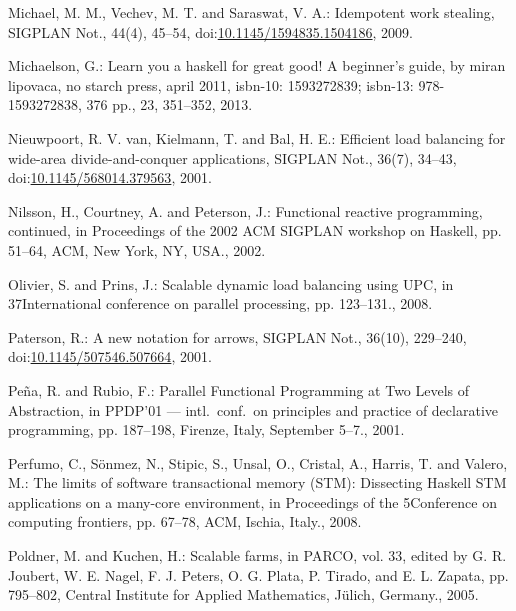 \documentclass[paper=A4,twoside=true,openright,parskip=full,chapterprefix=true,headings=normal,bibliography=totoc,listof=totoc,titlepage=on,captions=tableabove,draft=false,british]{scrreprt}%
\begin{document}
\leavevmode\hypertarget{ref-Michael:2009:IWS:1594835.1504186}{}%
Michael, M. M., Vechev, M. T. and Saraswat, V. A.: Idempotent work
stealing, SIGPLAN Not., 44(4), 45--54,
doi:\href{https://doi.org/10.1145/1594835.1504186}{10.1145/1594835.1504186},
2009.

\leavevmode\hypertarget{ref-learnyouahaskell}{}%
Michaelson, G.: Learn you a haskell for great good! A beginner's guide,
by miran lipovaca, no starch press, april 2011, isbn-10: 1593272839;
isbn-13: 978-1593272838, 376 pp., 23, 351--352, 2013.

\leavevmode\hypertarget{ref-vanNieuwpoort:2001:ELB:568014.379563}{}%
Nieuwpoort, R. V. van, Kielmann, T. and Bal, H. E.: Efficient load
balancing for wide-area divide-and-conquer applications, SIGPLAN Not.,
36(7), 34--43,\\
doi:\href{https://doi.org/10.1145/568014.379563}{10.1145/568014.379563},
2001.

\leavevmode\hypertarget{ref-Nilsson:2002:FRP:581690.581695}{}%
Nilsson, H., Courtney, A. and Peterson, J.: Functional reactive
programming, continued, in Proceedings of the 2002 ACM SIGPLAN workshop
on Haskell, pp. 51--64, ACM, New York, NY, USA., 2002.

\leavevmode\hypertarget{ref-4625841}{}%
Olivier, S. and Prins, J.: Scalable dynamic load balancing using UPC, in
37International conference on parallel processing, pp. 123--131., 2008.

\leavevmode\hypertarget{ref-Paterson:2001:NNA:507669.507664}{}%
Paterson, R.: A new notation for arrows, SIGPLAN Not., 36(10), 229--240,\\
doi:\href{https://doi.org/10.1145/507546.507664}{10.1145/507546.507664},
2001.

\leavevmode\hypertarget{ref-Eden:PPDP01}{}%
Peña, R. and Rubio, F.: Parallel Functional Programming at Two Levels of
Abstraction, in PPDP'01 --- intl.~conf.~on principles and practice of
declarative programming, pp. 187--198, Firenze, Italy, September 5--7.,
2001.

\leavevmode\hypertarget{ref-Perfumo:2008:LST:1366230.1366241}{}%
Perfumo, C., Sönmez, N., Stipic, S., Unsal, O., Cristal, A., Harris, T.
and Valero, M.: The limits of software transactional memory (STM):
Dissecting Haskell STM applications on a many-core environment, in
Proceedings of the 5Conference on computing frontiers, pp. 67--78, ACM,
Ischia, Italy., 2008.

\leavevmode\hypertarget{ref-Kuchen05}{}%
Poldner, M. and Kuchen, H.: Scalable farms, in PARCO, vol. 33, edited by
G. R. Joubert, W. E. Nagel, F. J. Peters, O. G. Plata, P. Tirado, and E.
L. Zapata, pp. 795--802, Central Institute for Applied Mathematics,
Jülich, Germany., 2005.
\end{document}
